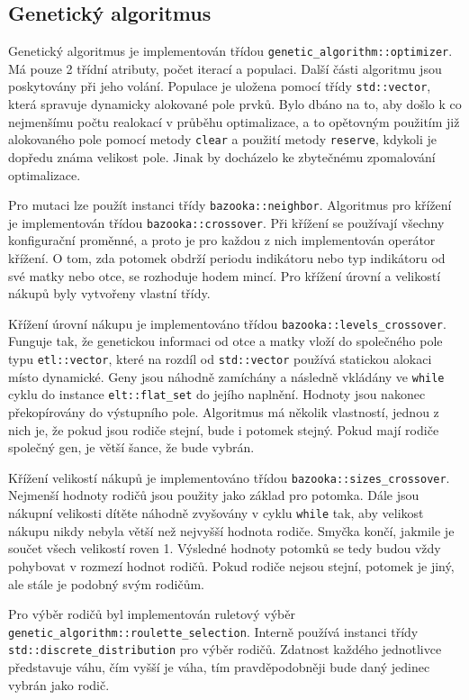 \subsection{Genetický algoritmus}
Genetický algoritmus je implementován třídou \texttt{genetic\_algorithm::optimizer}.
Má pouze 2 třídní atributy, počet iterací a populaci.
Další části algoritmu jsou poskytovány při jeho volání.
Populace je uložena pomocí třídy \texttt{std::vector}, která spravuje dynamicky alokované pole prvků.
Bylo dbáno na to, aby došlo k co nejmenšímu počtu realokací v průběhu optimalizace, a to opětovným použitím již alokovaného pole pomocí metody \texttt{clear} a použití metody \texttt{reserve}, kdykoli je dopředu známa velikost pole.
Jinak by docházelo ke zbytečnému zpomalování optimalizace.

Pro mutaci lze použít instanci třídy \texttt{bazooka::neighbor}.
Algoritmus pro křížení je implementován třídou \texttt{bazooka::crossover}.
Při křížení se používají všechny konfigurační proměnné, a proto je pro každou z nich implementován operátor křížení.
O tom, zda potomek obdrží periodu indikátoru nebo typ indikátoru od své matky nebo otce, se rozhoduje hodem mincí.
Pro křížení úrovní a velikostí nákupů byly vytvořeny vlastní třídy.

Křížení úrovní nákupu je implementováno třídou \texttt{bazooka::levels\_crossover}.
Funguje tak, že genetickou informaci od otce a matky vloží do společného pole typu \texttt{etl::vector}, které na rozdíl od \texttt{std::vector} používá statickou alokaci místo dynamické.
Geny jsou náhodně zamíchány a následně vkládány ve \texttt{while} cyklu do instance \texttt{elt::flat\_set} do jejího naplnění.
Hodnoty jsou nakonec překopírovány do výstupního pole.
Algoritmus má několik vlastností, jednou z nich je, že pokud jsou rodiče stejní, bude i potomek stejný.
Pokud mají rodiče společný gen, je větší šance, že bude vybrán.

Křížení velikostí nákupů je implementováno třídou \texttt{bazooka::sizes\_crossover}.
Nejmenší hodnoty rodičů jsou použity jako základ pro potomka.
Dále jsou nákupní velikosti dítěte náhodně zvyšovány v cyklu \texttt{while} tak, aby velikost nákupu nikdy nebyla větší než nejvyšší hodnota rodiče.
Smyčka končí, jakmile je součet všech velikostí roven 1.
Výsledné hodnoty potomků se tedy budou vždy pohybovat v rozmezí hodnot rodičů.
Pokud rodiče nejsou stejní, potomek je jiný, ale stále je podobný svým rodičům.

Pro výběr rodičů byl implementován ruletový výběr \texttt{genetic\_algorithm::roulette\_selection}.
Interně používá instanci třídy \texttt{std::discrete\_distribution} pro výběr rodičů.
Zdatnost každého jednotlivce představuje váhu, čím vyšší je váha, tím pravděpodobněji bude daný jedinec vybrán jako rodič.

